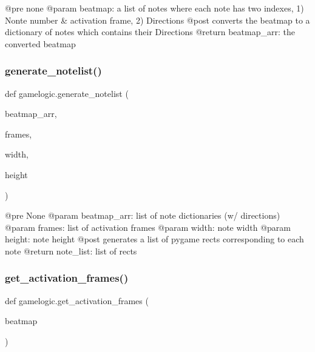 \begin{DoxyVerb}@pre none
@param beatmap: a list of notes where each note has two indexes, 1) Nonte number & activation frame, 2) Directions
@post converts the beatmap to a dictionary of notes which contains their Directions
@return beatmap_arr: the converted beatmap
\end{DoxyVerb}
 \mbox{\label{namespacegamelogic_a08f1091c44c6dc43a56a34aec202e888}} 
\subsubsection{\texorpdfstring{generate\+\_\+notelist()}{generate\_notelist()}}
{\footnotesize\ttfamily def gamelogic.\+generate\+\_\+notelist (\begin{DoxyParamCaption}\item[{}]{beatmap\+\_\+arr,  }\item[{}]{frames,  }\item[{}]{width,  }\item[{}]{height }\end{DoxyParamCaption})}

\begin{DoxyVerb}@pre None
@param beatmap_arr: list of note dictionaries (w/ directions)
@param frames: list of activation frames
@param width: note width
@param height: note height
@post generates a list of pygame rects corresponding to each note
@return note_list: list of rects
\end{DoxyVerb}
 \mbox{\label{namespacegamelogic_a9b9c9fd58c8093e039985584ad7c661b}} 
\subsubsection{\texorpdfstring{get\+\_\+activation\+\_\+frames()}{get\_activation\_frames()}}
{\footnotesize\ttfamily def gamelogic.\+get\+\_\+activation\+\_\+frames (\begin{DoxyParamCaption}\item[{}]{beatmap }\end{DoxyParamCaption})}

